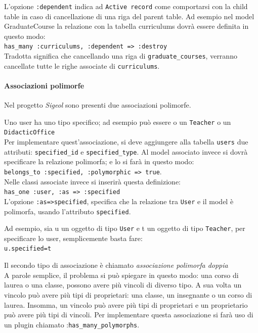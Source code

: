 \documentclass[11pt,a4paper]{article}
\begin{document}
L'opzione \verb|:dependent| indica ad \verb|Active record| come comportarsi con la child table in caso di cancellazione di una riga del parent table.
Ad esempio nel model GraduateCourse la relazione con la tabella curriculums dovrà essere definita in questo modo:\\
\verb|has_many :curriculums, :dependent => :destroy|\\
Tradotta significa che cancellando una riga di \verb|graduate_courses|, verranno cancellate tutte le righe associate di \verb|curriculums|.

\paragraph{Associazioni polimorfe}
Nel progetto \textit{Sigeol} sono presenti due associazioni polimorfe.


Uno user ha uno tipo specifico; ad esempio può essere o un \verb|Teacher| o un \verb|DidacticOffice|\\
Per implementare quest'associazione, si deve aggiungere alla tabella \verb|users| due attributi: \verb|specified_id| e \verb|specified_type|.
Al model associato invece si dovrà specificare la relazione polimorfa; e lo si farà in questo modo:\\
\verb|belongs_to :specified, :polymorphic => true|.\\
Nelle classi associate invece si inserirà questa definizione:\\
\verb|has_one :user, :as => :specified|\\
L'opzione \verb|:as=>specified|, specifica che la relazione tra \verb|User| e il model è polimorfa, usando l'attributo \verb|specified|.


Ad esempio, sia u un oggetto di tipo \verb|User| e t un oggetto di tipo \verb|Teacher|, per specificare lo user, semplicemente basta fare:\\
\verb|u.specified=t|

Il secondo tipo di associazione è chiamato \textit{associazione polimorfa doppia}\\ 
A parole semplice, il problema si può spiegare in questo modo: una corso di laurea o una classe, possono avere più vincoli di diverso tipo. A sua volta un vincolo può avere più tipi di proprietari: una classe, un insegnante o un corso di laurea.
Insomma, un vincolo può avere più tipi di proprietari e un proprietario può avere più tipi di vincoli. 
Per implementare questa associazione si farà uso di un plugin chiamato :\verb|has_many_polymorphs|. 
\end{document}
